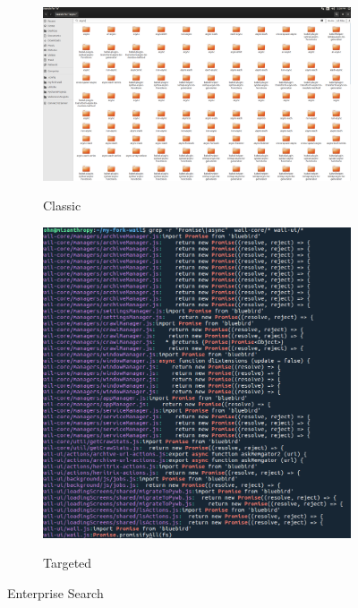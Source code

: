 \documentclass[a4paper,11pt]{article}
\begin{document}
\begin{figure}[h]
\begin{subfigure}{0.45\textwidth}
		  {\includegraphics[scale=0.3]{eSearch2.png}}
          \caption{Classic}
          \label{fig:cdeSearch}
      \end{subfigure}
      \vfill
      \begin{subfigure}{0.45\textwidth}
  {\includegraphics[scale=0.5]{eSearch.png}}   
    \caption{Targeted}
          \label{fig:tdeSearch}
      \end{subfigure}
      \caption{Enterprise Search}
  \label{fig:esearch}
\end{figure}
\newpage
\clearpage
\end{document}
